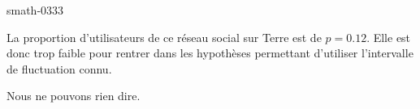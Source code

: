 
\begin{corrige}{smath-0333}

    La proportion d'utilisateurs de ce réseau social sur Terre est de \( p=0.12\). Elle est donc trop faible pour rentrer dans les hypothèses permettant d'utiliser l'intervalle de fluctuation connu.

    Nous ne pouvons rien dire.

\end{corrige}
